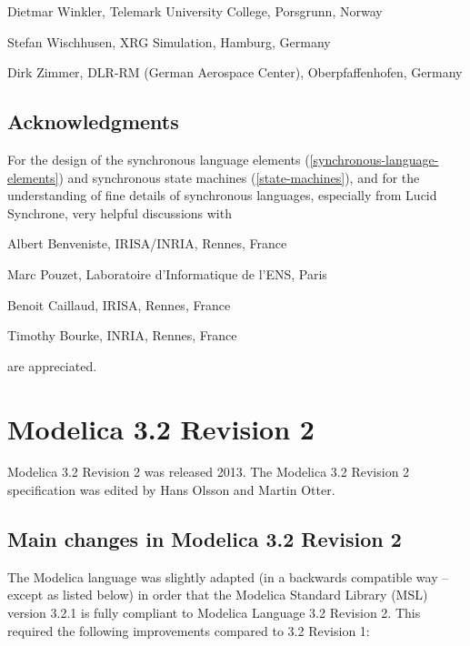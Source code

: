 \documentclass[10pt,a4paper]{report}
\def\doublelabel#1{\label{#1}}
\begin{document}
Dietmar Winkler, Telemark University College, Porsgrunn, Norway

Stefan Wischhusen, XRG Simulation, Hamburg, Germany

Dirk Zimmer, DLR-RM (German Aerospace Center), Oberpfaffenhofen, Germany

\subsection{Acknowledgments}\doublelabel{acknowledgments1}

For the design of the synchronous language elements (\ref{synchronous-language-elements}) and
synchronous state machines (\ref{state-machines}), and for the understanding of
fine details of synchronous languages, especially from Lucid Synchrone,
very helpful discussions with

Albert Benveniste, IRISA/INRIA, Rennes, France

Marc Pouzet, Laboratoire d'Informatique de l'ENS, Paris

Benoit Caillaud, IRISA, Rennes, France

Timothy Bourke, INRIA, Rennes, France

are appreciated.

\section{Modelica 3.2 Revision 2}\doublelabel{modelica-3-2-revision-2}

Modelica 3.2 Revision 2 was released 2013. The Modelica 3.2 Revision 2
specification was edited by Hans Olsson and Martin Otter.

\subsection{Main changes in Modelica 3.2 Revision 2}\doublelabel{main-changes-in-modelica-3-2-revision-2}

The Modelica language was slightly adapted (in a backwards compatible
way -- except as listed below) in order that the Modelica Standard
Library (MSL) version 3.2.1 is fully compliant to Modelica Language 3.2
Revision 2. This required the following improvements compared to 3.2
Revision 1:
\end{document}
